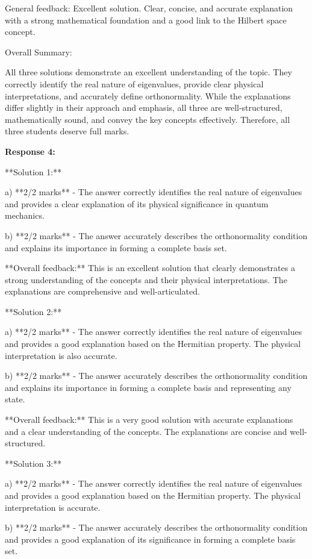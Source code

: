 \documentclass[a4paper,11pt]{article}
\begin{document}
General feedback: Excellent solution. Clear, concise, and accurate explanation with a strong mathematical foundation and a good link to the Hilbert space concept.

Overall Summary:

All three solutions demonstrate an excellent understanding of the topic. They correctly identify the real nature of eigenvalues, provide clear physical interpretations, and accurately define orthonormality. While the explanations differ slightly in their approach and emphasis, all three are well-structured, mathematically sound, and convey the key concepts effectively. Therefore, all three students deserve full marks.

\textbf{Response 4:}

**Solution 1:**

a) **2/2 marks** - The answer correctly identifies the real nature of eigenvalues and provides a clear explanation of its physical significance in quantum mechanics.

b) **2/2 marks** - The answer accurately describes the orthonormality condition and explains its importance in forming a complete basis set.

**Overall feedback:** This is an excellent solution that clearly demonstrates a strong understanding of the concepts and their physical interpretations. The explanations are comprehensive and well-articulated.

**Solution 2:**

a) **2/2 marks** - The answer correctly identifies the real nature of eigenvalues and provides a good explanation based on the Hermitian property. The physical interpretation is also accurate.

b) **2/2 marks** - The answer accurately describes the orthonormality condition and explains its importance in forming a complete basis and representing any state.

**Overall feedback:** This is a very good solution with accurate explanations and a clear understanding of the concepts. The explanations are concise and well-structured.

**Solution 3:**

a) **2/2 marks** - The answer correctly identifies the real nature of eigenvalues and provides a good explanation based on the Hermitian property. The physical interpretation is accurate.

b) **2/2 marks** - The answer accurately describes the orthonormality condition and provides a good explanation of its significance in forming a complete basis set.
\end{document}
